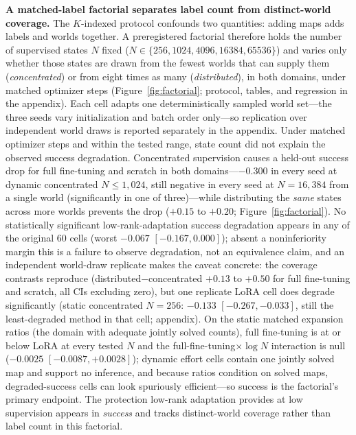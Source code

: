 \documentclass[letterpaper]{article} %
\begin{document}
\textbf{A matched-label factorial separates label count from distinct-world coverage.} The $K$-indexed protocol confounds two quantities: adding maps adds labels and worlds together. A preregistered factorial therefore holds the number of supervised states $N$ fixed ($N \in \{256, 1024, 4096, 16384, 65536\}$) and varies only whether those states are drawn from the fewest worlds that can supply them (\emph{concentrated}) or from eight times as many (\emph{distributed}), in both domains, under matched optimizer steps (Figure~\ref{fig:factorial}; protocol, tables, and regression in the appendix). Each cell adapts one deterministically sampled world set---the three seeds vary initialization and batch order only---so replication over independent world draws is reported separately in the appendix. Under matched optimizer steps and within the tested range, state count did not explain the observed success degradation. Concentrated supervision causes a held-out success drop for full fine-tuning and scratch in both domains---$-0.300$ in every seed at dynamic concentrated $N \leq 1{,}024$, still negative in every seed at $N{=}16{,}384$ from a single world (significantly in one of three)---while distributing the \emph{same} states across more worlds prevents the drop ($+0.15$ to $+0.20$; Figure~\ref{fig:factorial}). No statistically significant low-rank-adaptation success degradation appears in any of the original 60 cells (worst $-0.067$ $[-0.167, 0.000]$); absent a noninferiority margin this is a failure to observe degradation, not an equivalence claim, and an independent world-draw replicate makes the caveat concrete: the coverage contrasts reproduce (distributed$-$concentrated $+0.13$ to $+0.50$ for full fine-tuning and scratch, all CIs excluding zero), but one replicate LoRA cell does degrade significantly (static concentrated $N{=}256$: $-0.133$ $[-0.267, -0.033]$, still the least-degraded method in that cell; appendix). On the static matched expansion ratios (the domain with adequate jointly solved counts), full fine-tuning is at or below LoRA at every tested $N$ and the full-fine-tuning$\times\log N$ interaction is null ($-0.0025$ $[-0.0087, +0.0028]$); dynamic effort cells contain one jointly solved map and support no inference, and because ratios condition on solved maps, degraded-success cells can look spuriously efficient---so success is the factorial's primary endpoint. The protection low-rank adaptation provides at low supervision appears in \emph{success} and tracks distinct-world coverage rather than label count in this factorial.
\end{document}
